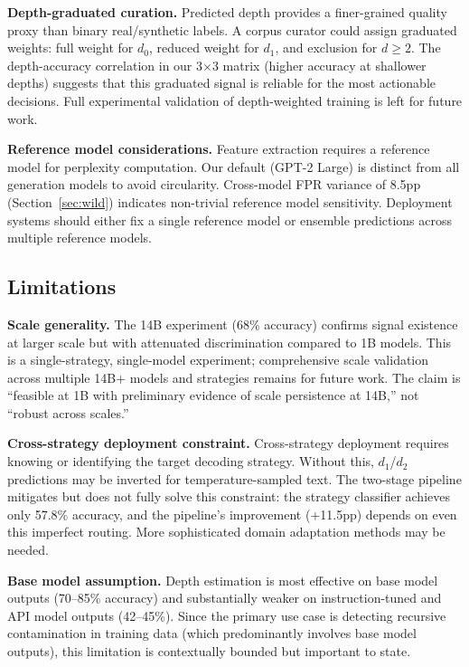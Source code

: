 \documentclass[11pt,a4paper]{article}
\begin{document}
\textbf{Depth-graduated curation.} Predicted depth provides a finer-grained quality proxy than binary real/synthetic labels. A corpus curator could assign graduated weights: full weight for $d_0$, reduced weight for $d_1$, and exclusion for $d \geq 2$. The depth-accuracy correlation in our 3$\times$3 matrix (higher accuracy at shallower depths) suggests that this graduated signal is reliable for the most actionable decisions. Full experimental validation of depth-weighted training is left for future work.

\textbf{Reference model considerations.} Feature extraction requires a reference model for perplexity computation. Our default (GPT-2 Large) is distinct from all generation models to avoid circularity. Cross-model FPR variance of 8.5pp (Section~\ref{sec:wild}) indicates non-trivial reference model sensitivity. Deployment systems should either fix a single reference model or ensemble predictions across multiple reference models.

\subsection{Limitations}
\label{sec:limitations}

\textbf{Scale generality.} The 14B experiment (68\% accuracy) confirms signal existence at larger scale but with attenuated discrimination compared to 1B models. This is a single-strategy, single-model experiment; comprehensive scale validation across multiple 14B+ models and strategies remains for future work. The claim is ``feasible at 1B with preliminary evidence of scale persistence at 14B,'' not ``robust across scales.''

\textbf{Cross-strategy deployment constraint.} Cross-strategy deployment requires knowing or identifying the target decoding strategy. Without this, $d_1$/$d_2$ predictions may be inverted for temperature-sampled text. The two-stage pipeline mitigates but does not fully solve this constraint: the strategy classifier achieves only 57.8\% accuracy, and the pipeline's improvement (+11.5pp) depends on even this imperfect routing. More sophisticated domain adaptation methods may be needed.

\textbf{Base model assumption.} Depth estimation is most effective on base model outputs (70--85\% accuracy) and substantially weaker on instruction-tuned and API model outputs (42--45\%). Since the primary use case is detecting recursive contamination in training data (which predominantly involves base model outputs), this limitation is contextually bounded but important to state.
\end{document}
